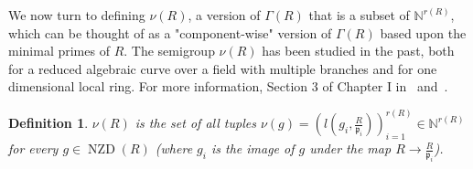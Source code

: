 \documentclass{article}
\newtheorem{definition}[theorem]{Definition}
\newtheorem{remark}[theorem]{Remark}
\DeclareMathOperator{\ord}{ord}
\DeclareMathOperator{\NZD}{NZD}
\DeclareMathOperator{\mult}{mult}
\numberwithin{theorem}{section}
\begin{document}








We now turn to defining $\nu(R)$,  a version of $\Gamma(R)$ that is a subset of $\mathbb{N}^{r(R)}$, which can be thought of as a "component-wise" version of $\Gamma(R)$ based upon the minimal primes of $R$. The semigroup $\nu(R)$ has been studied in the past, both for a reduced algebraic curve over a field with multiple branches and for one dimensional local ring. For more information, Section 3 of Chapter I in~\cite{greuel2007introduction} and~\cite{de1987semigroup,campillo1994gorenstein, d2025value, zariski2006moduli, campillo1994gorenstein}. 

\begin{definition}\label{def:nu}
    $\nu(R)$ is the set of all tuples $\nu(g) = \left( l\left(g_i,\frac{R}{\mathfrak{p}_i}\right) \right)_{i=1}^{r(R)} \in \mathbb{N}^{r(R)}$ for every $g \in \NZD(R)$ (where $g_i$ is the image of $g$ under the map $R \to \frac{R}{\mathfrak{p}_i}$). 
\end{definition}
\end{document}
